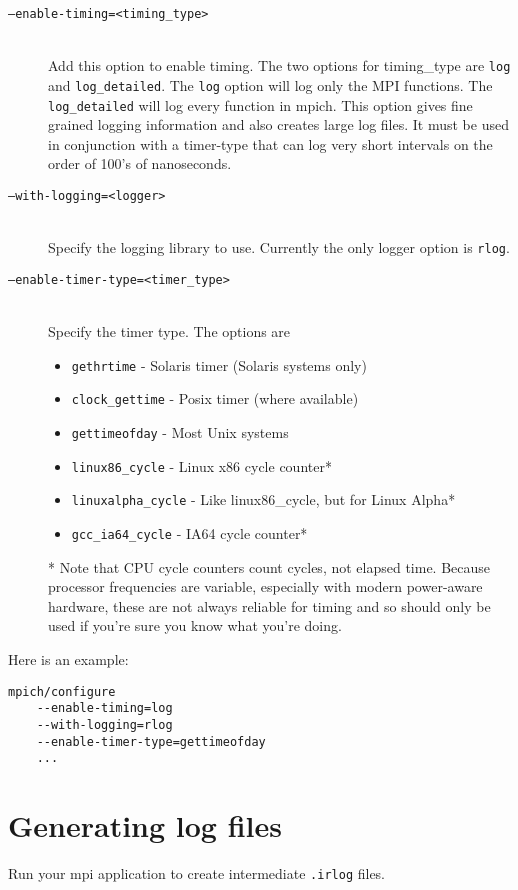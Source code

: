 \documentclass[dvipdfm,11pt]{article}
\begin{document}
\begin{description}
\item[\texttt{--enable-timing=<timing\_type>}]\mbox{}\\
Add this option to enable timing.  The two options for timing\_type are 
\texttt{log} and \texttt{log\_detailed}.  The \texttt{log} option will log 
only the MPI functions.  The 
\texttt{log\_detailed} will log every function in mpich.  This option gives 
fine grained logging information and also creates large log files.  It must 
be used in conjunction with a timer-type that can log very short intervals 
on the order of 100's of nanoseconds.

\item[\texttt{--with-logging=<logger>}]\mbox{}\\
Specify the logging library to use.  Currently the only logger option is \texttt{rlog}.

\item[\texttt{--enable-timer-type=<timer\_type>}]\mbox{}\\
Specify the timer type.  The options are
\begin{itemize}
\item \texttt{gethrtime} -
Solaris timer (Solaris systems only)
\item \texttt{clock\_gettime} -
Posix timer (where available)
\item \texttt{gettimeofday} -
Most Unix systems
\item \texttt{linux86\_cycle} -
Linux x86 cycle counter*
\item \texttt{linuxalpha\_cycle} -
Like linux86\_cycle, but for Linux Alpha*
\item \texttt{gcc\_ia64\_cycle} -
IA64 cycle counter*
\end{itemize}
* Note that CPU cycle counters count cycles, not elapsed time.
Because processor frequencies are variable, especially with modern
power-aware hardware, these are not always reliable for timing and so
should only be used if you're sure you know what you're doing.

\end{description}

Here is an example:
\begin{verbatim}
mpich/configure
    --enable-timing=log
    --with-logging=rlog
    --enable-timer-type=gettimeofday
    ...
\end{verbatim}

\section{Generating log files}
\label{sec:genlogs}
Run your mpi application to create intermediate \texttt{.irlog} files.
\end{document}
